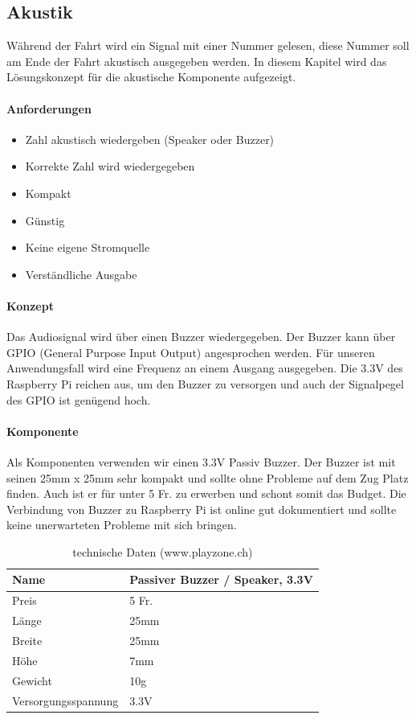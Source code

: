 \documentclass[../../main.tex]{subfiles}
\begin{document}
\subsection{Akustik}
Während der Fahrt wird ein Signal mit einer Nummer gelesen, diese Nummer soll am Ende der Fahrt akustisch ausgegeben werden. In diesem Kapitel wird das Lösungskonzept für die akustische Komponente aufgezeigt.

\paragraph{Anforderungen}
\begin{itemize}
    \item Zahl akustisch wiedergeben (Speaker oder Buzzer)
    \item Korrekte Zahl wird wiedergegeben
    \item Kompakt
    \item Günstig
    \item Keine eigene Stromquelle
    \item Verständliche Ausgabe
\end{itemize}

\paragraph{Konzept}
Das Audiosignal wird über einen Buzzer wiedergegeben. Der Buzzer kann über GPIO (General Purpose Input Output)
angesprochen werden. Für unseren Anwendungsfall wird eine Frequenz an einem Ausgang ausgegeben. Die 3.3V des Raspberry
Pi reichen aus, um den Buzzer zu versorgen und auch der Signalpegel des GPIO ist genügend hoch.

\paragraph{Komponente}
Als Komponenten verwenden wir einen 3.3V Passiv Buzzer. Der Buzzer ist mit seinen 25mm x 25mm sehr kompakt und sollte ohne Probleme auf dem Zug Platz finden. Auch ist er für unter 5 Fr. zu erwerben und schont somit das Budget. Die Verbindung von Buzzer zu Raspberry Pi ist online gut dokumentiert und sollte keine unerwarteten Probleme mit sich bringen.

\begin{table}[H]
\begin{center}
\begin{tabular}{ll}
Name & Passiver Buzzer / Speaker, 3.3V \\ \hline
Preis & 5 Fr.    \\ \hline
Länge & 25mm    \\ \hline
Breite & 25mm   \\ \hline
Höhe & 7mm      \\ \hline
Gewicht & 10g   \\ \hline
Versorgungsspannung & 3.3V \\ \hline
\end{tabular}
\caption{technische Daten (www.playzone.ch)}
\end{center}
\end{table}
\end{document}
